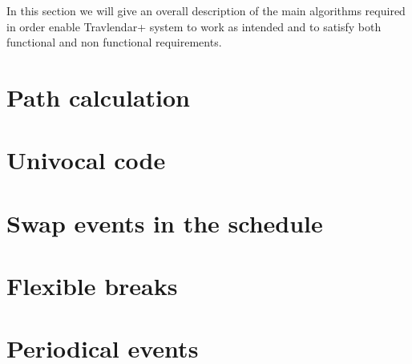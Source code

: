 In this section we will give an overall description of the main algorithms required in order enable Travlendar+ system to work as intended and to satisfy both functional and non functional requirements.

\section{Path calculation}
\label{sect:Path calculation}
	

\section{Univocal code}
\label{sect: Univocal code}
	

\section{Swap events in the schedule}
\label{sect: Swap events in the schedule}
	

\section{Flexible breaks}
\label{sect: Flexible breaks}
	

\section{Periodical events}
\label{sect: Periodical events}
	

